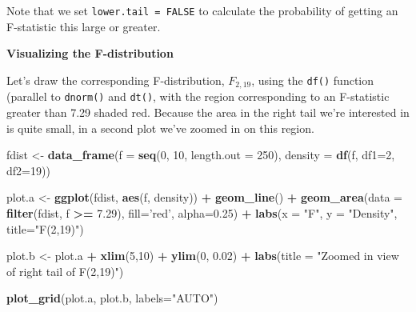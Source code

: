 \documentclass[]{book}
\newenvironment{Shaded}{\begin{snugshade}}{\end{snugshade}}
\newcommand{\DataTypeTok}[1]{\textcolor[rgb]{0.13,0.29,0.53}{#1}}
\newcommand{\DecValTok}[1]{\textcolor[rgb]{0.00,0.00,0.81}{#1}}
\newcommand{\FloatTok}[1]{\textcolor[rgb]{0.00,0.00,0.81}{#1}}
\newcommand{\KeywordTok}[1]{\textcolor[rgb]{0.13,0.29,0.53}{\textbf{#1}}}
\newcommand{\NormalTok}[1]{#1}
\newcommand{\OperatorTok}[1]{\textcolor[rgb]{0.81,0.36,0.00}{\textbf{#1}}}
\newcommand{\StringTok}[1]{\textcolor[rgb]{0.31,0.60,0.02}{#1}}
\theoremstyle{definition}
\theoremstyle{definition}
\theoremstyle{definition}
\theoremstyle{remark}
\begin{document}
Note that we set \texttt{lower.tail\ =\ FALSE} to calculate the
probability of getting an F-statistic this large or greater.

\textbf{Visualizing the F-distribution}

Let's draw the corresponding F-distribution, \(F_{2,19}\), using the
\texttt{df()} function (parallel to \texttt{dnorm()} and \texttt{dt()},
with the region corresponding to an F-statistic greater than 7.29 shaded
red. Because the area in the right tail we're interested in is quite
small, in a second plot we've zoomed in on this region.

\begin{Shaded}
\begin{Highlighting}[]
\NormalTok{fdist <-}\StringTok{ }\KeywordTok{data_frame}\NormalTok{(}\DataTypeTok{f =} \KeywordTok{seq}\NormalTok{(}\DecValTok{0}\NormalTok{, }\DecValTok{10}\NormalTok{, }\DataTypeTok{length.out =} \DecValTok{250}\NormalTok{),}
                    \DataTypeTok{density =} \KeywordTok{df}\NormalTok{(f, }\DataTypeTok{df1=}\DecValTok{2}\NormalTok{, }\DataTypeTok{df2=}\DecValTok{19}\NormalTok{))}

\NormalTok{plot.a <-}\StringTok{ }
\StringTok{  }\KeywordTok{ggplot}\NormalTok{(fdist, }\KeywordTok{aes}\NormalTok{(f, density)) }\OperatorTok{+}\StringTok{ }
\StringTok{  }\KeywordTok{geom_line}\NormalTok{() }\OperatorTok{+}\StringTok{ }
\StringTok{  }\KeywordTok{geom_area}\NormalTok{(}\DataTypeTok{data =} \KeywordTok{filter}\NormalTok{(fdist, f }\OperatorTok{>=}\StringTok{ }\FloatTok{7.29}\NormalTok{), }\DataTypeTok{fill=}\StringTok{'red'}\NormalTok{, }\DataTypeTok{alpha=}\FloatTok{0.25}\NormalTok{) }\OperatorTok{+}
\StringTok{  }\KeywordTok{labs}\NormalTok{(}\DataTypeTok{x =} \StringTok{"F"}\NormalTok{, }\DataTypeTok{y =} \StringTok{"Density"}\NormalTok{, }\DataTypeTok{title=}\StringTok{"F(2,19)"}\NormalTok{)}

\NormalTok{plot.b <-}\StringTok{ }
\StringTok{  }\NormalTok{plot.a }\OperatorTok{+}\StringTok{ }\KeywordTok{xlim}\NormalTok{(}\DecValTok{5}\NormalTok{,}\DecValTok{10}\NormalTok{) }\OperatorTok{+}\StringTok{ }\KeywordTok{ylim}\NormalTok{(}\DecValTok{0}\NormalTok{, }\FloatTok{0.02}\NormalTok{) }\OperatorTok{+}\StringTok{ }
\StringTok{  }\KeywordTok{labs}\NormalTok{(}\DataTypeTok{title =} \StringTok{"Zoomed in view of right tail of F(2,19)"}\NormalTok{)}

\KeywordTok{plot_grid}\NormalTok{(plot.a, plot.b, }\DataTypeTok{labels=}\StringTok{"AUTO"}\NormalTok{)}
\end{Highlighting}
\end{Shaded}
\end{document}

